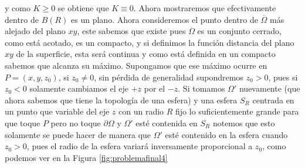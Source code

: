 \documentclass[oneside,11pt]{memoir}
\begin{document}
y como $K\geq 0$ se obtiene que $K\equiv 0$. Ahora mostraremos que efectivamente dentro de $B(R)$ es un plano. Ahora consideremos el punto dentro de $\overline{\Omega}$ más alejado del plano $xy$, este sabemos que existe pues $\overline{\Omega}$ es un conjunto cerrado, como está acotado, es un compacto, y si definimos la función distancia del plano $xy$ de la superficie, esta será continua y como está definida en un compacto sabemos que alcanza su máximo. Supongamos que ese máximo ocurre en $P=(x,y,z_0)$, si $z_0\neq 0$, sin pérdida de generalidad supondremos $z_0>0$, pues si $z_0<0$ solamente cambiamos el eje $+z$ por el $-z$. Si tomamos $\Omega'$ nuevamente (que ahora sabemos que tiene la topología de una esfera) y una esfera $S_R$ centrada en un punto que variable del eje $z$ con un radio $R$ fijo lo suficientemente grande para que toque $P$ pero no toque $\partial \Omega$ y $\Omega'$ esté contenida en $S_R$ notemos que esto solamente se puede hacer de manera que $\Omega'$ esté contenido en la esfera cuando $z_0>0$, pues el radio de la esfera variará inversamente proporcional a $z_0$, como podemos ver en la Figura \ref{fig:problemafinal4}
\end{document}
